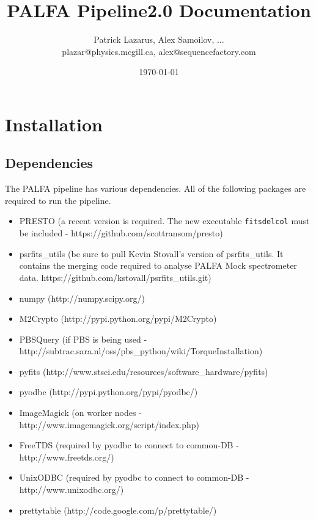 


\title{PALFA Pipeline2.0 Documentation}
\author{Patrick Lazarus, Alex Samoilov, ... \\
        plazar@physics.mcgill.ca, alex@sequencefactory.com}
\date{\today}

\maketitle

\begin{abstract}
\end{abstract}

\section{Installation}
\subsection{Dependencies}
The PALFA pipeline has various dependencies. All of the following packages are required to run the pipeline.
\begin{itemize}
    \item PRESTO (a recent version is required. The new executable \texttt{fitsdelcol} must be included - https://github.com/scottransom/presto)
    \item psrfits\_utils (be sure to pull Kevin Stovall's version of psrfits\_utils. It contains the merging code required to analyse PALFA Mock spectrometer data. https://github.com/kstovall/psrfits\_utils.git)
    \item numpy (http://numpy.scipy.org/)
    \item M2Crypto (http://pypi.python.org/pypi/M2Crypto)
    \item PBSQuery (if PBS is being used - http://subtrac.sara.nl/oss/pbs\_python/wiki/TorqueInstallation)
    \item pyfits (http://www.stsci.edu/resources/software\_hardware/pyfits)
    \item pyodbc (http://pypi.python.org/pypi/pyodbc/)
    \item ImageMagick (on worker nodes - http://www.imagemagick.org/script/index.php)
    \item FreeTDS (required by pyodbc to connect to common-DB - http://www.freetds.org/)
    \item UnixODBC (required by pyodbc to connect to common-DB - http://www.unixodbc.org/)
    \item prettytable (http://code.google.com/p/prettytable/)
\end{itemize}

